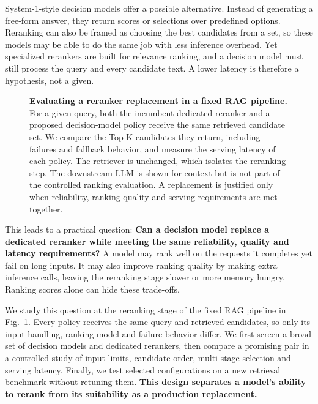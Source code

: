 \documentclass[conference]{IEEEtran}
\begin{document}
{System-1-style decision models offer a possible alternative. Instead of generating a free-form answer, they return scores or selections over predefined options. Reranking can also be framed as choosing the best candidates from a set, so these models may be able to do the same job with less inference overhead. Yet specialized rerankers are built for relevance ranking, and a decision model must still process the query and every candidate text. A lower latency is therefore a hypothesis, not a given.

\begin{figure}[t]
\centering
\caption{\textbf{Evaluating a reranker replacement in a fixed RAG pipeline.} For a given query, both the incumbent dedicated reranker and a proposed decision-model policy receive the same retrieved candidate set. We compare the Top-K candidates they return, including failures and fallback behavior, and measure the serving latency of each policy. The retriever is unchanged, which isolates the reranking step. The downstream LLM is shown for context but is not part of the controlled ranking evaluation. A replacement is justified only when reliability, ranking quality and serving requirements are met together.}
\label{fig:pipeline}
\end{figure}

This leads to a practical question: \textbf{Can a decision model replace a dedicated reranker while meeting the same reliability, quality and latency requirements?} A model may rank well on the requests it completes yet fail on long inputs. It may also improve ranking quality by making extra inference calls, leaving the reranking stage slower or more memory hungry. Ranking scores alone can hide these trade-offs.

We study this question at the reranking stage of the fixed RAG pipeline in Fig.~\ref{fig:pipeline}. Every policy receives the same query and retrieved candidates, so only its input handling, ranking model and failure behavior differ. We first screen a broad set of decision models and dedicated rerankers, then compare a promising pair in a controlled study of input limits, candidate order, multi-stage selection and serving latency. Finally, we test selected configurations on a new retrieval benchmark without retuning them. \textbf{This design separates a model's ability to rerank from its suitability as a production replacement.}

}
\end{document}
